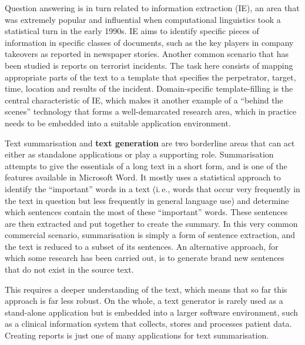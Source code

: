 \begin{multicols}{2}

Question answering is in turn related to information extraction (IE), an area that was extremely popular and influential when computational linguistics took a statistical turn in the early 1990s. IE aims to identify specific pieces of information in specific classes of documents, such as the key players in company takeovers as reported in newspaper stories. Another common scenario that has been studied is reports on terrorist incidents. The task here consists of mapping appropriate parts of the text to a template that specifies the perpetrator, target, time, location and results of the incident. Domain-specific template-filling is the central characteristic of IE, which makes it another example of a “behind the scenes” technology that forms a well-demarcated research area, which in practice needs to be embedded into a suitable application environment. 

    Text summarisation and \textbf{text generation} are two borderline areas that can act either as standalone applications or play a supporting role. Summarisation attempts to give the essentials of a long text in a short form, and is one of the features available in Microsoft Word. It mostly uses a statistical approach to identify the “important” words in a text (i.\,e., words that occur very frequently in the text in question but less frequently in general language use) and determine which sentences contain the most of these “important” words. These sentences are then extracted and put together to create the summary. In this very common commercial scenario, summarisation is simply a form of sentence extraction, and the text is reduced to a subset of its sentences. An alternative approach, for which some research has been carried out, is to generate brand new sentences that do not exist in the source text. 


This requires a deeper understanding of the text, which means that so far this approach is far less robust. On the whole, a text generator is rarely used as a stand-alone application but is embedded into a larger software environment, such as a clinical information system that collects, stores and processes patient data. Creating reports is just one of many applications for text summarisation. 


\end{multicols}
